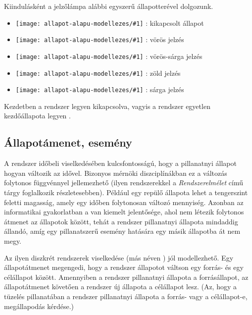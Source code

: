 \begin{megjegyzes}
Kiindulásként a jelzőlámpa alábbi egyszerű állapotterével dolgozunk.
 
\newcommand{\allapotikon}[1]{\texttt{[image: allapot-alapu-modellezes/\#1]}}
 
\begin{itemize}
\item \allapotikon{tl_empty} : kikapcsolt állapot
\item \allapotikon{tl_red} : vörös jelzés
\item \allapotikon{tl_redyellow} : vörös-sárga jelzés
\item \allapotikon{tl_green} : zöld jelzés
\item \allapotikon{tl_yellow} : sárga jelzés
\end{itemize}

Kezdetben a rendszer legyen kikapcsolva, vagyis a rendszer egyetlen kezdőállapota legyen .
\end{megjegyzes}

\subsection{Állapotámenet, esemény}

A rendszer időbeli viselkedésében kulcsfontosságú, hogy a pillanatnyi állapot hogyan változik az idővel. Bizonyos mérnöki diszciplínákban ez a változás folytonos függvénnyel jellemezhető (ilyen rendszerekkel a \emph{Rendszerelmélet} című tárgy foglalkozik részletesebben). Például egy repülő állapota lehet a tengerszint feletti magasság, amely egy időben folytonosan változó mennyiség. Azonban az informatikai gyakorlatban a  van kiemelt jelentősége, ahol nem létezik folytonos átmenet az állapotok között, tehát a rendszer pillanatnyi állapota mindaddig állandó, amíg egy pillanatszerű esemény hatására egy másik állapotba át nem megy.

Az ilyen diszkrét rendszerek viselkedése  (más néven ) jól modellezhető. Egy állapotátmenet megengedi, hogy a rendszer állapotot váltson egy forrás- és egy célállapot között. Amennyiben a rendszer pillanatnyi állapota a forrásállapot, az állapotátmenet  követően a rendszer új állapota a célállapot lesz. (Az, hogy a tüzelés pillanatában a rendszer pillanatnyi állapota a forrás- vagy a célállapot-e, megállapodás kérdése.)


